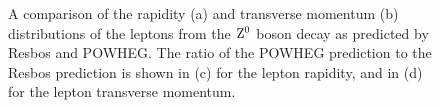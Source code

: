 \documentclass{cmspaper}
\begin{document}
\begin{figure}[htb]
  \begin{center}
    \caption{A comparison of the rapidity (a) and transverse momentum (b) distributions of the leptons from the $\mathrm{Z^0}$ boson decay as predicted by Resbos and POWHEG. The ratio of the POWHEG prediction to the Resbos prediction is shown in (c) for the lepton rapidity, and in (d) for the lepton transverse momentum.}
    \label{fig:ResbosVsPowheg_LeptonRapidityPt}
  \end{center}
\end{figure}
\end{document}
